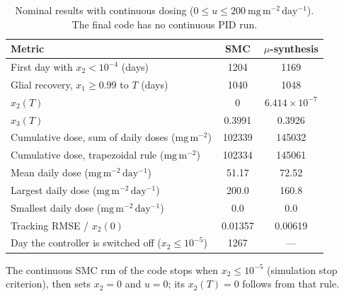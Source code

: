 \begin{table}[htbp]
\centering
\caption{Nominal results with continuous dosing ($0\le u\le 200~\mathrm{mg\,m^{-2}\,day^{-1}}$). The final code has no continuous PID run.}
\label{tab:continuous_summary}
\small
\begin{tabular}{lcc}
\toprule
Metric & SMC & $\mu$-synthesis \\
\midrule
First day with $x_2<10^{-4}$ (days) & 1204 & 1169 \\
Glial recovery, $x_1\ge 0.99$ to $T$ (days) & 1040 & 1048 \\
$x_2(T)$ & $0$ & $6.414{\times}10^{-7}$ \\
$x_3(T)$ & 0.3991 & 0.3926 \\
Cumulative dose, sum of daily doses ($\mathrm{mg\,m^{-2}}$) & 102339 & 145032 \\
Cumulative dose, trapezoidal rule ($\mathrm{mg\,m^{-2}}$) & 102334 & 145061 \\
Mean daily dose ($\mathrm{mg\,m^{-2}\,day^{-1}}$) & 51.17 & 72.52 \\
Largest daily dose ($\mathrm{mg\,m^{-2}\,day^{-1}}$) & 200.0 & 160.8 \\
Smallest daily dose ($\mathrm{mg\,m^{-2}\,day^{-1}}$) & 0.0 & 0.0 \\
Tracking RMSE / $x_2(0)$ & 0.01357 & 0.00619 \\
Day the controller is switched off ($x_2\le10^{-5}$) & 1267 & --- \\
\bottomrule
\end{tabular}
\par\smallskip\footnotesize The continuous SMC run of the code stops when $x_2\le10^{-5}$ (simulation stop criterion), then sets $x_2=0$ and $u=0$; its $x_2(T)=0$ follows from that rule.
\end{table}
